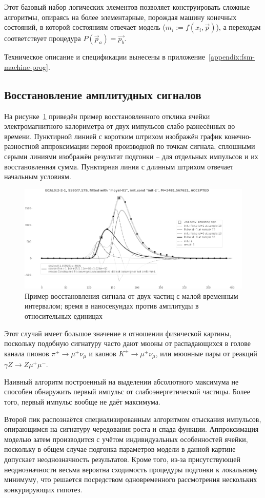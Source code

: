 Этот базовый набор логических элементов позволяет конструировать сложные
алгоритмы, опираясь на более элементарные, порождая машину
конечных состояний, в которой состояниям отвечает модель ($m_i:=f(x_i,\vec{p})$),
а переходам соответствует процедура $P(\vec{p}_a) = \vec{p_b}$.

Техническое описание и спецификации вынесены в приложение~\ref{appendix:fsm-machine-prog}.

\subsection{Восстановление амплитудных сигналов}

На рисунке~\ref{fig:sadc-wf-fitting-example} приведён пример
восстановленного отклика ячейки электромагнитного калориметра от двух
импульсов слабо разнесённых во времени. Пунктирной линией
с коротким штрихом
изображён график конечно-разностной аппроксимации первой производной
по точкам сигнала, сплошными серыми линиями изображён результат
подгонки -- для отдельных импульсов и их восстановленная сумма.
Пунктирная линия с длинным штрихом отвечает начальным условиям.

\begin{figure}[ht]
    \centering
    \includegraphics[width=0.99\linewidth]{images//illustrative/waveform-fit-result-example.png}
    \caption{Пример восстановления сигнала от двух частиц с малой временным
    интервалом; время в наносекундах против амплитуды в относительных единицах}
    \label{fig:sadc-wf-fitting-example}
\end{figure}

Этот случай имеет большое значение в отношении физической картины,
поскольку подобную сигнатуру часто дают мюоны от
распадающихся в голове канала
пионов $\pi^{\pm} \rightarrow \mu^{\pm} \nu_\mu$ 
и каонов $K^{\pm} \rightarrow \mu^{\pm} \nu_\mu$,
или мюонные пары от реакций $\gamma Z \rightarrow Z \mu^{+}\mu^{-}$.

Наивный алгоритм построенный на выделении абсолютного максимума
не способен обнаружить первый импульс от слабоэнергетической частицы.
Более того, первый импульс вообще не даёт максимума. 

Второй пик распознаётся специализированным алгоритмом отыскания
импульсов, опирающимся на сигнатуру чередования роста и спада
функции. Аппроксимация моделью затем производится с учётом
индивидуальных особенностей ячейки, поскольку в общем случае
подгонка параметров модели в данной картине допускает неоднозначность
результатов. Кроме того, из-за присутствующей неоднозначности
весьма вероятна сходимость процедуры подгонки к локальному минимуму,
что решается посредством одновременного рассмотрения
нескольких конкурирующих гипотез.
